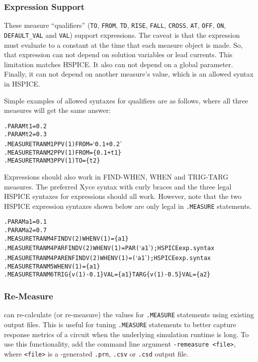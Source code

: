 \subsubsection{Expression Support}
These measure ``qualifiers'' (\texttt{TO}, \texttt{FROM}, \texttt{TD},
\texttt{RISE}, \texttt{FALL}, \texttt{CROSS}, \texttt{AT}, \texttt{OFF},
\texttt{ON}, \texttt{DEFAULT\_VAL} and \texttt{VAL}) support expressions.
The caveat is that the expression must evaluate to a constant at the time
that each measure object is made.  So, that expression can not depend
on solution variables or lead currents.  This limitation matches HSPICE.
It also can not depend on a global parameter.  Finally, it can not depend
on another measure's value, which is an allowed syntax in HSPICE.

Simple examples of allowed syntaxes for qualifiers are as follows, where
all three measures will get the same answer:
\begin{alltt}
.PARAM t1=0.2
.PARAM t2=0.3
.MEASURE TRAN M1 PP V(1) FROM=`0.1+0.2'
.MEASURE TRAN M2 PP V(1) FROM=\{0.1+t1\}
.MEASURE TRAN M3 PP V(1) TO=\{t2\}
\end{alltt}
Expressions should also work in FIND-WHEN, WHEN and TRIG-TARG measures. The
preferred Xyce syntax with curly braces and the three legal HSPICE syntaxes
for expressions should all work.  However, note that the two HSPICE
expression syntaxes shown below are only legal in \Xyce{} \texttt{.MEASURE}
statements.
\begin{alltt}
.PARAM a1=0.1
.PARAM a2=0.7
.MEASURE TRAN M4 FIND V(2) WHEN V(1)=\{a1\}
.MEASURE TRAN M4PAR FIND V(2) WHEN V(1)=PAR(`a1') ; HSPICE exp. syntax
.MEASURE TRAN M4PAREN FIND V(2) WHEN V(1)=(`a1')  ; HSPICE exp. syntax
.MEASURE TRAN M5 WHEN V(1)=\{a1\}
.MEASURE TRAN M6 TRIG \{v(1)-0.1\} VAL=\{a1\} TARG \{v(1)-0.5\} VAL=\{a2\}
\end{alltt}

\subsubsection{Re-Measure}
\label{Measure_ReMeasure}
\Xyce{} can re-calculate (or re-measure) the values for {\tt .MEASURE}
statements using existing \Xyce{} output files.  This is useful for 
tuning {\tt .MEASURE} statements to better capture response metrics of a circuit when 
the underlying simulation runtime is long.  To use this functionality, add the command 
line argument {\tt -remeasure <file>}, where {\tt <file>} is a \Xyce{}-generated 
{\tt .prn}, {\tt .csv} or {\tt .csd} output file.  

